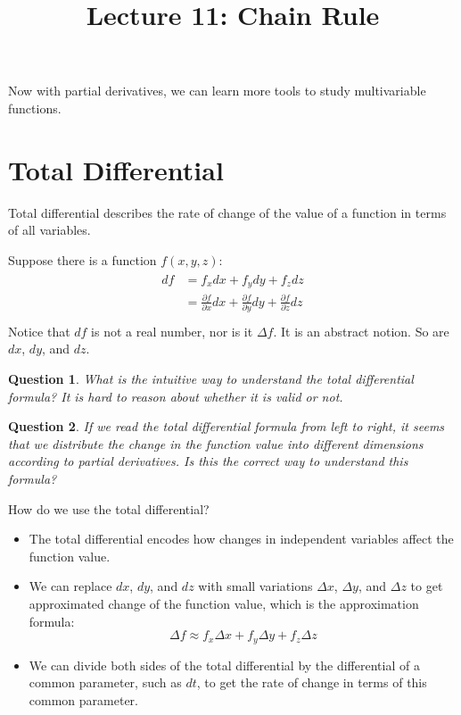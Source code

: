 \documentclass{article}
\title{Lecture 11: Chain Rule}
\author{}
\date{}
\newtheorem{question}{Question}
\begin{document}
    
\maketitle

Now with partial derivatives, we can learn more tools to study multivariable 
functions.

\section{Total Differential}

Total differential describes the rate of change of the value of a function in 
terms of all variables.

Suppose there is a function $f(x, y, z)$:
\begin{gather*}
  \begin{split}
    df &= f_xdx + f_ydy + f_zdz \\
       &= \frac{\partial f}{\partial x}dx + \frac{\partial f}{\partial y}dy + \frac{\partial f}{\partial z}dz \\
  \end{split}
\end{gather*}
Notice that $df$ is not a real number, nor is it $\Delta f$. It is an abstract 
notion. So are $dx$, $dy$, and $dz$.

\begin{question}
  What is the intuitive way to understand the total differential formula? It is 
  hard to reason about whether it is valid or not.
\end{question}

\begin{question}
  If we read the total differential formula from left to right, it seems that we 
  distribute the change in the function value into different dimensions 
  according to partial derivatives. Is this the correct way to understand this 
  formula?
\end{question}

How do we use the total differential?
\begin{itemize}
  \item The total differential encodes how changes in independent variables 
    affect the function value.
  \item We can replace $dx$, $dy$, and $dz$ with small variations $\Delta x$, 
    $\Delta y$, and $\Delta z$ to get approximated change of the function value, 
    which is the approximation formula:
    \begin{equation*}
      \Delta f \approx f_x \Delta x + f_y \Delta y + f_z \Delta z
    \end{equation*}
  \item We can divide both sides of the total differential by the differential 
    of a common parameter, such as $dt$, to get the rate of change in terms of 
    this common parameter.
\end{itemize}
\end{document}
